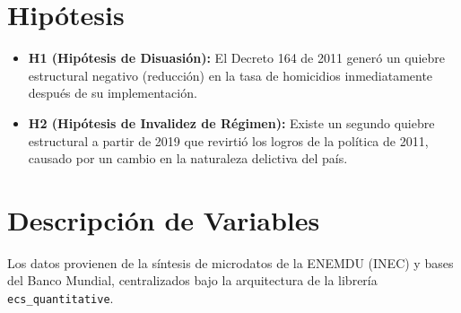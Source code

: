 \documentclass[12pt,spanish]{article}
\providecommand{\tightlist}{%
  \setlength{\itemsep}{0pt}\setlength{\parskip}{0pt}}
\begin{document}
\section{Hipótesis}\label{hipuxf3tesis}

\begin{itemize}
\tightlist
\item
  \textbf{H1 (Hipótesis de Disuasión):} El Decreto 164 de 2011 generó un
  quiebre estructural negativo (reducción) en la tasa de homicidios
  inmediatamente después de su implementación.
\item
  \textbf{H2 (Hipótesis de Invalidez de Régimen):} Existe un segundo
  quiebre estructural a partir de 2019 que revirtió los logros de la
  política de 2011, causado por un cambio en la naturaleza delictiva del
  país.
\end{itemize}

\section{Descripción de Variables}\label{descripciuxf3n-de-variables}

Los datos provienen de la síntesis de microdatos de la ENEMDU (INEC) y
bases del Banco Mundial, centralizados bajo la arquitectura de la
librería \texttt{ecs\_quantitative}.
\end{document}
